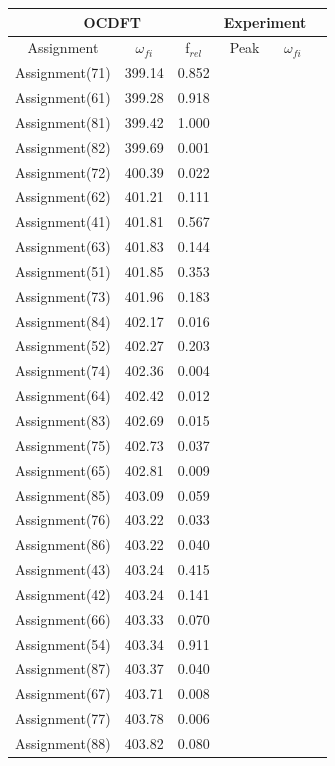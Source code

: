 \documentclass[11.5pt]{article}
\begin{document}
 \begin{table}
 \centering
    \begin{tabular}{c@{\hskip 0.22in}c@{\hskip 0.22in}c@{\hskip 0.52in}c@{\hskip 0.22in}c@{\hskip 0.22in}c}
     \hline
     \hline
   \multicolumn{3}{c}{OCDFT} &\multicolumn{2}{c}{Experiment} \\
   \hline
   Assignment & $\omega_{fi}$ & f$_{rel}$ & Peak &  $\omega_{fi}$   \\
   \hline
 Assignment(71) & 399.14 & 0.852 \\
 Assignment(61) & 399.28 & 0.918 \\
 Assignment(81) & 399.42 & 1.000 \\
 Assignment(82) & 399.69 & 0.001 \\
 Assignment(72) & 400.39 & 0.022 \\
 Assignment(62) & 401.21 & 0.111 \\
 Assignment(41) & 401.81 & 0.567 \\
 Assignment(63) & 401.83 & 0.144 \\
 Assignment(51) & 401.85 & 0.353 \\
 Assignment(73) & 401.96 & 0.183 \\
 Assignment(84) & 402.17 & 0.016 \\
 Assignment(52) & 402.27 & 0.203 \\
 Assignment(74) & 402.36 & 0.004 \\
 Assignment(64) & 402.42 & 0.012 \\
 Assignment(83) & 402.69 & 0.015 \\
 Assignment(75) & 402.73 & 0.037 \\
 Assignment(65) & 402.81 & 0.009 \\
 Assignment(85) & 403.09 & 0.059 \\
 Assignment(76) & 403.22 & 0.033 \\
 Assignment(86) & 403.22 & 0.040 \\
 Assignment(43) & 403.24 & 0.415 \\
 Assignment(42) & 403.24 & 0.141 \\
 Assignment(66) & 403.33 & 0.070 \\
 Assignment(54) & 403.34 & 0.911 \\
 Assignment(87) & 403.37 & 0.040 \\
 Assignment(67) & 403.71 & 0.008 \\
 Assignment(77) & 403.78 & 0.006 \\
 Assignment(88) & 403.82 & 0.080 \\

\end{tabular}
\end{table}
\end{document}
